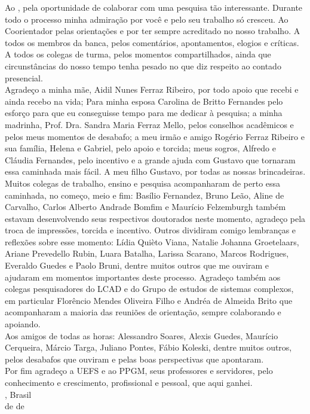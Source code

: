 
\begin{agradecimentos}
Ao \theadvisor, pela oportunidade de colaborar com uma pesquisa tão interessante. Durante todo o processo minha admiração por você e pelo seu trabalho só cresceu. Ao Coorientador \thecoadvisor pelas orientações e por ter sempre acreditado no nosso trabalho. A todos os membros da banca, pelos comentários, apontamentos, elogios e críticas. A todos os colegas de turma, pelos momentos compartilhados, ainda que circunstâncias do nosso tempo tenha pesado no que diz respeito ao contado presencial.
\\
Agradeço a minha mãe, Aidil Nunes Ferraz Ribeiro, por todo apoio que recebi e ainda recebo na vida; Para minha esposa Carolina de Britto Fernandes pelo esforço para que eu conseguisse tempo para me dedicar à pesquisa; a minha madrinha, Prof. Dra. Sandra Maria Ferraz Mello, pelos conselhos acadêmicos e pelos meus momentos de desabafo; a meu irmão e amigo Rogério Ferraz Ribeiro e sua família, Helena e Gabriel, pelo apoio e torcida; meus sogros, Alfredo e Cláudia Fernandes, pelo incentivo e a grande ajuda com Gustavo que tornaram essa caminhada mais fácil. A meu filho Gustavo, por todas as nossas brincadeiras.
\\
Muitos colegas de trabalho, ensino e pesquisa acompanharam de perto essa caminhada, no começo, meio e fim: Basílio Fernandez, Bruno Leão, Aline de Carvalho, Carlos Alberto Andrade Bomfim e Maurício Felzemburgh também estavam desenvolvendo seus respectivos doutorados neste momento, agradeço pela troca de impressões, torcida e incentivo. Outros dividiram comigo lembranças e reflexões sobre esse momento: Lídia Quièto Viana, Natalie Johanna Groetelaars, Ariane Prevedello Rubin, Luara Batalha, Larissa Scarano, Marcos Rodrigues, Everaldo Guedes e Paolo Bruni, dentre muitos outros que me ouviram e ajudaram em momentos importantes deste processo. Agradeço também aos colegas pesquisadores do LCAD e do Grupo de estudos de sistemas complexos, em particular Florêncio Mendes Oliveira Filho e Andréa de Almeida Brito que acompanharam a maioria das reuniões de orientação, sempre colaborando e apoiando.
\\
Aos amigos de todas as horas: Alessandro Soares, Alexis Guedes, Maurício Cerqueira,  Márcio Targa, Juliano Pontes, Fábio Koleski, dentre muitos outros, pelos desabafos que ouviram e pelas boas perspectivas que apontaram.
\\
Por fim agradeço a UEFS e ao PPGM, seus professores e servidores, pelo conhecimento e crescimento, profissional e pessoal, que aqui ganhei.
\\

\noindent
\ppgmcidade, Brasil \hfill \theauthor\\
\ppgmdia\space de \ppgmmes\space de \ppgmano
\end{agradecimentos}
